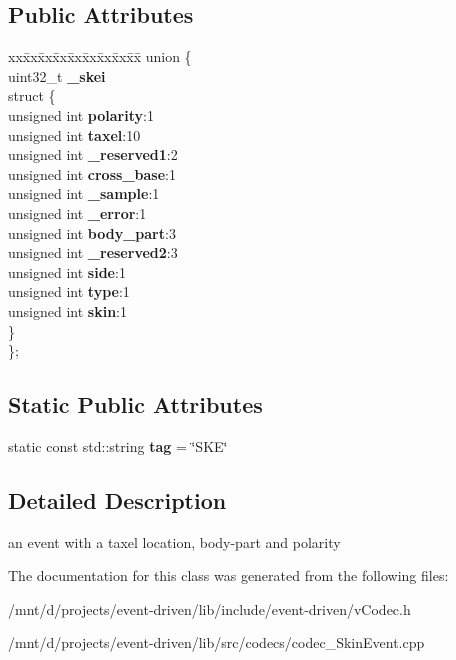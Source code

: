 \subsection*{Public Attributes}
\begin{DoxyCompactItemize}
\item 
\mbox{\label{classev_1_1SkinEvent_afb407a5519d25f22eb740e6ea63e59b9}} 
\begin{tabbing}
xx\=xx\=xx\=xx\=xx\=xx\=xx\=xx\=xx\=\kill
union \{\\
\>uint32\_t {\bfseries \_skei}\\
\mbox{\label{unionev_1_1SkinEvent_1_1_0D5_a8200e9dff378e05d18f6e37dd77ab9a0}} 
\>struct \{\\
\>\>unsigned int {\bfseries polarity}:1\\
\>\>unsigned int {\bfseries taxel}:10\\
\>\>unsigned int {\bfseries \_reserved1}:2\\
\>\>unsigned int {\bfseries cross\_base}:1\\
\>\>unsigned int {\bfseries \_sample}:1\\
\>\>unsigned int {\bfseries \_error}:1\\
\>\>unsigned int {\bfseries body\_part}:3\\
\>\>unsigned int {\bfseries \_reserved2}:3\\
\>\>unsigned int {\bfseries side}:1\\
\>\>unsigned int {\bfseries type}:1\\
\>\>unsigned int {\bfseries skin}:1\\
\>\} \\
\}; \\

\end{tabbing}\end{DoxyCompactItemize}
\subsection*{Static Public Attributes}
\begin{DoxyCompactItemize}
\item 
\mbox{\label{classev_1_1SkinEvent_a04891c06417b71a75dc0d4d377301aa5}} 
static const std\+::string {\bfseries tag} = \char`\"{}S\+KE\char`\"{}
\end{DoxyCompactItemize}


\subsection{Detailed Description}
an event with a taxel location, body-\/part and polarity 

The documentation for this class was generated from the following files\+:\begin{DoxyCompactItemize}
\item 
/mnt/d/projects/event-\/driven/lib/include/event-\/driven/v\+Codec.\+h\item 
/mnt/d/projects/event-\/driven/lib/src/codecs/codec\+\_\+\+Skin\+Event.\+cpp\end{DoxyCompactItemize}
